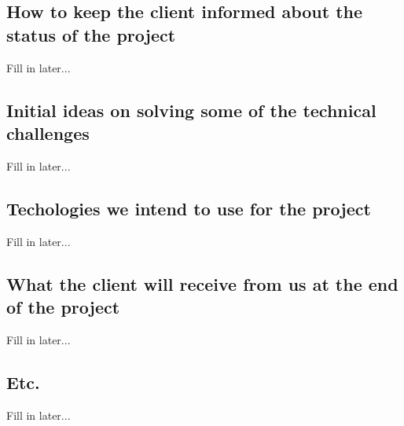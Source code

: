 \documentclass[12pt, oneside]{article}
\begin{document}
	\subsection{How to keep the client informed about the status of the project}
		Fill in later...
	\subsection{Initial ideas on solving some of the technical challenges}
		Fill in later...
	\subsection{Techologies we intend to use for the project}
		Fill in later...
	\subsection{What the client will receive from us at the end of the project}
		Fill in later...
	\subsection{Etc.}
		Fill in later...
\end{document}
